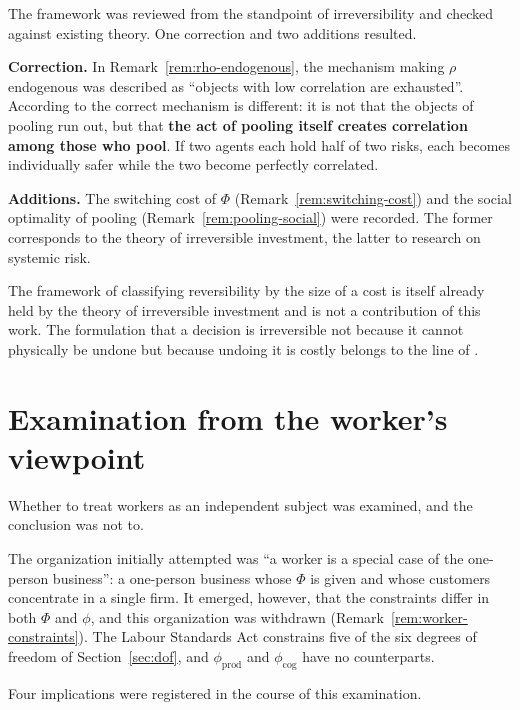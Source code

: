 The framework was reviewed from the standpoint of irreversibility and checked against existing
theory. One correction and two additions resulted.

\textbf{Correction.} In Remark~\ref{rem:rho-endogenous}, the mechanism making $\rho$ endogenous was
described as ``objects with low correlation are exhausted''. According to \cite{wagner2010} the
correct mechanism is different: it is not that the objects of pooling run out, but that
\textbf{the act of pooling itself creates correlation among those who pool}.
If two agents each hold half of two risks, each becomes individually safer while the two become
perfectly correlated.

\textbf{Additions.} The switching cost of $\Phi$ (Remark~\ref{rem:switching-cost}) and the social
optimality of pooling (Remark~\ref{rem:pooling-social}) were recorded. The former corresponds to
the theory of irreversible investment, the latter to research on systemic risk.

The framework of classifying reversibility by the size of a cost is itself already held by the
theory of irreversible investment and is not a contribution of this work. The formulation that a
decision is irreversible not because it cannot physically be undone but because undoing it is
costly belongs to the line of \cite{dixit1994}.

\section{Examination from the worker's viewpoint}
\label{sec:worker-predictions}

Whether to treat workers as an independent subject was examined, and the conclusion was not to.

The organization initially attempted was ``a worker is a special case of the one-person business'':
a one-person business whose $\Phi$ is given and whose customers concentrate in a single firm. It
emerged, however, that the constraints differ in both $\Phi$ and $\phi$, and this organization was
withdrawn (Remark~\ref{rem:worker-constraints}). The Labour Standards Act constrains five of the
six degrees of freedom of Section~\ref{sec:dof}, and $\phi_{\mathrm{prod}}$ and
$\phi_{\mathrm{cog}}$ have no counterparts.

Four implications were registered in the course of this examination.

